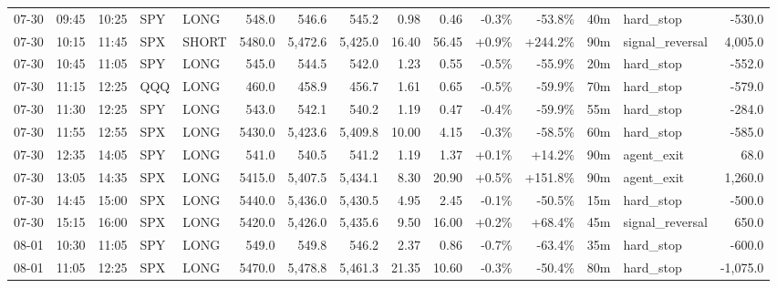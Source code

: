 \documentclass[11pt,a4paper,twoside]{article}
\begin{document}
\begin{landscape}
\begin{center}
\begin{longtable}{>{\color{txtmain}}l l l l l r r r r r r r r >{\color{txtmain}}l r}
07-30 & 09:45 & 10:25 & SPY & LONG & 548.0 & 546.6 & 545.2 & 0.98 & 0.46 & \textcolor{lossred}{-0.3\%} & \textcolor{lossred}{-53.8\%} & 40m & hard\_stop & \textcolor{lossred}{-530.0} \\
07-30 & 10:15 & 11:45 & SPX & SHORT & 5480.0 & 5,472.6 & 5,425.0 & 16.40 & 56.45 & \textcolor{wingreen}{+0.9\%} & \textcolor{wingreen}{+244.2\%} & 90m & signal\_reversal & \textcolor{wingreen}{4,005.0} \\
07-30 & 10:45 & 11:05 & SPY & LONG & 545.0 & 544.5 & 542.0 & 1.23 & 0.55 & \textcolor{lossred}{-0.5\%} & \textcolor{lossred}{-55.9\%} & 20m & hard\_stop & \textcolor{lossred}{-552.0} \\
07-30 & 11:15 & 12:25 & QQQ & LONG & 460.0 & 458.9 & 456.7 & 1.61 & 0.65 & \textcolor{lossred}{-0.5\%} & \textcolor{lossred}{-59.9\%} & 70m & hard\_stop & \textcolor{lossred}{-579.0} \\
07-30 & 11:30 & 12:25 & SPY & LONG & 543.0 & 542.1 & 540.2 & 1.19 & 0.47 & \textcolor{lossred}{-0.4\%} & \textcolor{lossred}{-59.9\%} & 55m & hard\_stop & \textcolor{lossred}{-284.0} \\
07-30 & 11:55 & 12:55 & SPX & LONG & 5430.0 & 5,423.6 & 5,409.8 & 10.00 & 4.15 & \textcolor{lossred}{-0.3\%} & \textcolor{lossred}{-58.5\%} & 60m & hard\_stop & \textcolor{lossred}{-585.0} \\
07-30 & 12:35 & 14:05 & SPY & LONG & 541.0 & 540.5 & 541.2 & 1.19 & 1.37 & \textcolor{wingreen}{+0.1\%} & \textcolor{wingreen}{+14.2\%} & 90m & agent\_exit & \textcolor{wingreen}{68.0} \\
07-30 & 13:05 & 14:35 & SPX & LONG & 5415.0 & 5,407.5 & 5,434.1 & 8.30 & 20.90 & \textcolor{wingreen}{+0.5\%} & \textcolor{wingreen}{+151.8\%} & 90m & agent\_exit & \textcolor{wingreen}{1,260.0} \\
07-30 & 14:45 & 15:00 & SPX & LONG & 5440.0 & 5,436.0 & 5,430.5 & 4.95 & 2.45 & \textcolor{lossred}{-0.1\%} & \textcolor{lossred}{-50.5\%} & 15m & hard\_stop & \textcolor{lossred}{-500.0} \\
07-30 & 15:15 & 16:00 & SPX & LONG & 5420.0 & 5,426.0 & 5,435.6 & 9.50 & 16.00 & \textcolor{wingreen}{+0.2\%} & \textcolor{wingreen}{+68.4\%} & 45m & signal\_reversal & \textcolor{wingreen}{650.0} \\
08-01 & 10:30 & 11:05 & SPY & LONG & 549.0 & 549.8 & 546.2 & 2.37 & 0.86 & \textcolor{lossred}{-0.7\%} & \textcolor{lossred}{-63.4\%} & 35m & hard\_stop & \textcolor{lossred}{-600.0} \\
08-01 & 11:05 & 12:25 & SPX & LONG & 5470.0 & 5,478.8 & 5,461.3 & 21.35 & 10.60 & \textcolor{lossred}{-0.3\%} & \textcolor{lossred}{-50.4\%} & 80m & hard\_stop & \textcolor{lossred}{-1,075.0} \\

\end{longtable}
\end{center}
\end{landscape}
\end{document}
